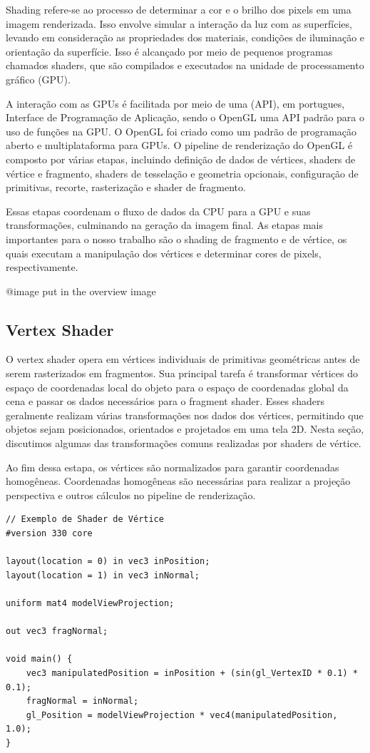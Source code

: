 \documentclass[english, 
               brazil, 
               bsc] %
               {dcomp-abntex2}
\begin{document}
Shading refere-se ao processo de determinar a cor e o brilho dos pixels em uma imagem renderizada. Isso envolve simular a interação da luz com as superfícies, levando em consideração as propriedades dos materiais, condições de iluminação e orientação da superfície. Isso é alcançado por meio de pequenos programas chamados shaders, que são compilados e executados na unidade de processamento gráfico (GPU).


A interação com as GPUs é facilitada por meio de uma 
(API), em portugues, Interface de Programação de Aplicação, sendo o OpenGL uma API padrão para o uso de funções na GPU. O OpenGL foi criado como um padrão de programação aberto e multiplataforma para GPUs. O pipeline de renderização do OpenGL é composto por várias etapas, incluindo definição de dados de vértices, shaders de vértice e fragmento, shaders de tesselação e geometria opcionais, configuração de primitivas, recorte, rasterização e shader de fragmento.

Essas etapas coordenam o fluxo de dados da CPU para a GPU e suas transformações, culminando na geração da imagem final. As etapas mais importantes para o nosso trabalho são o shading de fragmento e de vértice, os quais executam a manipulação dos vértices e determinar cores de pixels, respectivamente.

@image put in the overview image


\subsection{Vertex Shader}

O vertex shader opera em vértices individuais de primitivas geométricas antes de serem rasterizados em fragmentos. Sua principal tarefa é transformar vértices do espaço de coordenadas local do objeto para o espaço de coordenadas global da cena e passar os dados necessários para o fragment shader. Esses shaders geralmente realizam várias transformações nos dados dos vértices, permitindo que objetos sejam posicionados, orientados e projetados em uma tela 2D. Nesta seção, discutimos algumas das transformações comuns realizadas por shaders de vértice.

Ao fim dessa estapa, os vértices são normalizados para garantir coordenadas homogêneas. Coordenadas homogêneas são necessárias para realizar a projeção perspectiva e outros cálculos no pipeline de renderização.


\begin{verbatim}
// Exemplo de Shader de Vértice
#version 330 core

layout(location = 0) in vec3 inPosition;
layout(location = 1) in vec3 inNormal;

uniform mat4 modelViewProjection;

out vec3 fragNormal;

void main() {
    vec3 manipulatedPosition = inPosition + (sin(gl_VertexID * 0.1) * 0.1);
    fragNormal = inNormal;
    gl_Position = modelViewProjection * vec4(manipulatedPosition, 1.0);
}
\end{verbatim}
\end{document}
